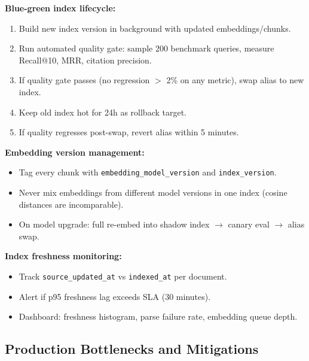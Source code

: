 \textbf{Blue-green index lifecycle:}

\begin{enumerate}
  \item Build new index version in background with updated embeddings/chunks.
  \item Run automated quality gate: sample 200 benchmark queries, measure Recall@10, MRR, citation precision.
  \item If quality gate passes (no regression $>$ 2\% on any metric), swap alias to new index.
  \item Keep old index hot for 24h as rollback target.
  \item If quality regresses post-swap, revert alias within 5 minutes.
\end{enumerate}

\textbf{Embedding version management:}

\begin{itemize}
  \item Tag every chunk with \texttt{embedding\_model\_version} and \texttt{index\_version}.
  \item Never mix embeddings from different model versions in one index (cosine distances are incomparable).
  \item On model upgrade: full re-embed into shadow index $\rightarrow$ canary eval $\rightarrow$ alias swap.
\end{itemize}

\textbf{Index freshness monitoring:}

\begin{itemize}
  \item Track \texttt{source\_updated\_at} vs \texttt{indexed\_at} per document.
  \item Alert if p95 freshness lag exceeds SLA (30 minutes).
  \item Dashboard: freshness histogram, parse failure rate, embedding queue depth.
\end{itemize}

\subsection*{Production Bottlenecks and Mitigations}

